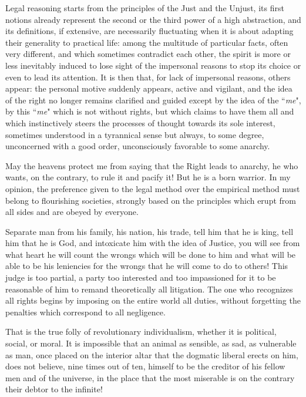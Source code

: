 Legal reasoning starts from the principles of the Just and the Unjust, its first notions already represent the second or the third power of a high abstraction, and its definitions, if extensive, are necessarily fluctuating when it is about adapting their generality to practical life: among the multitude of particular facts, often very different, and which sometimes contradict each other, the spirit is more or less inevitably induced to lose sight of the impersonal reasons to stop its choice or even to lead its attention. It is then that, for lack of impersonal reasons, others appear: the personal motive suddenly appears, active and vigilant, and the idea of the right no longer remains clarified and guided except by the idea of the ``\emph{me}", by this ``\emph{me}" which is not without rights, but which claims to have them all and which instinctively steers the processes of thought towards its sole interest, sometimes understood in a tyrannical sense but always, to some degree, unconcerned with a good order, unconsciously favorable to some anarchy.

May the heavens protect me from saying that the Right leads to anarchy, he who wants, on the contrary, to rule it and pacify it! But he is a born warrior. In my opinion, the preference given to the legal method over the empirical method must belong to flourishing societies, strongly based on the principles which erupt from all sides and are obeyed by everyone.

Separate man from his family, his nation, his trade, tell him that he is king, tell him that he is God, and intoxicate him with the idea of Justice, you will see from what heart he will count the wrongs which will be done to him and what will be able to be his leniencies for the wrongs that he will come to do to others! This judge is too partial, a party too interested and too impassioned for it to be reasonable of him to remand theoretically all litigation. The one who recognizes all rights begins by imposing on the entire world all duties, without forgetting the penalties which correspond to all negligence.

That is the true folly of revolutionary individualism, whether it is political, social, or moral. It is impossible that an animal as sensible, as sad, as vulnerable as man, once placed on the interior altar that the dogmatic liberal erects on him, does not believe, nine times out of ten, himself to be the creditor of his fellow men and of the universe, in the place that the most miserable is on the contrary their debtor to the infinite!

